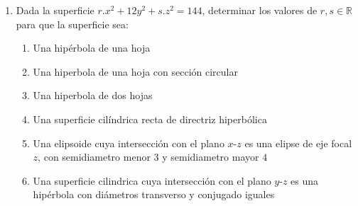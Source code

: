 \documentclass[a4paper]{article}
\newcommand{\exercise}{\item}
\begin{document}
\begin{enumerate}
	\exercise Dada la superficie $r.x^2+12y^2+s.z^2=144$, determinar los valores de $r,s \in \mathbb{R}$ para que la superficie sea:
	\begin{multicols}{2}
	\begin{enumerate} [label=(\alph*)]
		
		\item Una hipérbola de una hoja
		\item Una hiperbola de una hoja con sección circular
		\item Una hiperbola de dos hojas
		\item Una superficie cilíndrica recta de directriz hiperbólica
		\item Una elipsoide cuya intersección con el plano $x$-$z$ es una elipse de eje focal $z$, con semidiametro menor $3$ y semidiametro mayor $4$
		\item Una superficie cilindrica cuya intersección con el plano $y$-$z$ es una hipérbola con diámetros transverso y conjugado iguales 

	\end{enumerate}
	\end{multicols}

\end{enumerate}
\end{document}
